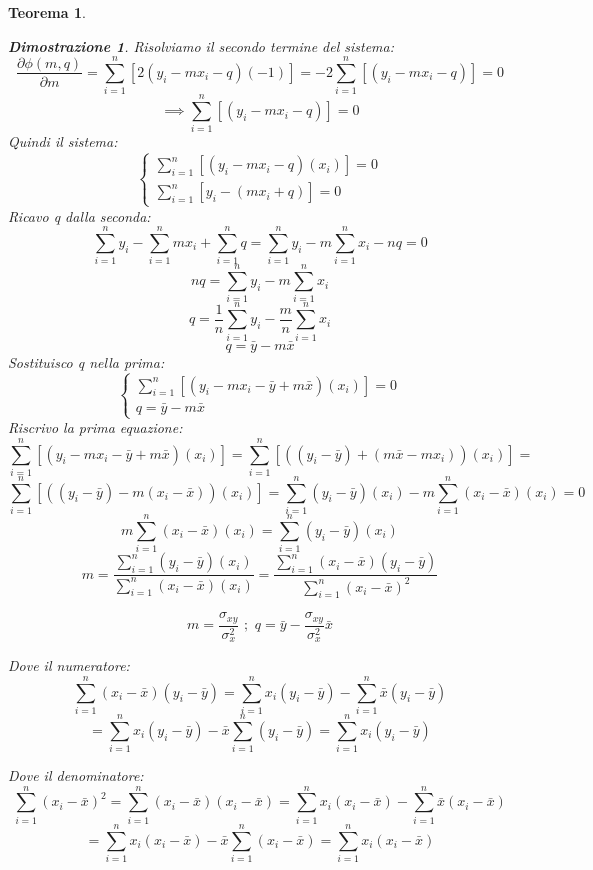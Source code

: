 \documentclass{article}
\newtheorem{teorema}{Teorema}[section]
\newtheorem{dimostrazione}{Dimostrazione}
\begin{document}
\begin{teorema}
\begin{dimostrazione}
              Risolviamo il secondo termine del sistema: 
             $$\frac{\partial\phi(m,q)}{\partial m} = \sum_{i=1}^{n} [2(y_i-mx_i-q)(-1)] =  -2\sum_{i=1}^{n} [(y_i-mx_i-q)]=0 $$ 
             $$\implies\sum_{i=1}^{n} [(y_i-mx_i-q)]=0 
             $$
             Quindi il sistema: 
             $$
              \begin{cases}
               \sum_{i=1}^{n} [(y_i-mx_i-q)(x_i)]=0 \\
               \sum_{i=1}^{n} [y_i-(mx_i+q)]=0 
             \end{cases}
             $$
             Ricavo q dalla seconda: 
             $$\sum_{i=1}^{n}y_i-\sum_{i=1}^{n}mx_i+\sum_{i=1}^{n}q=
             \sum_{i=1}^{n}y_i-m\sum_{i=1}^{n}x_i-nq=0$$
             $$
                nq = \sum_{i=1}^{n}y_i-m\sum_{i=1}^{n}x_i
             $$
             $$ q = \frac{1}{n}\sum_{i=1}^{n}y_i-\frac{m}{n}\sum_{i=1}^{n}x_i$$
             $$ q =\bar{y}-m\bar{x}$$
             Sostituisco q nella prima: 
             $$
             \begin{cases}
               \sum_{i=1}^{n} [(y_i-mx_i-\bar{y}+m\bar{x})(x_i)]=0 \\
               q =\bar{y}-m\bar{x}
             \end{cases}
             $$
             Riscrivo la prima equazione: 
             $$\sum_{i=1}^{n} [(y_i-mx_i-\bar{y}+m\bar{x})(x_i)]=
               \sum_{i=1}^{n} [((y_i-\bar{y})+(m\bar{x}-mx_i))(x_i)]=$$
               $$\sum_{i=1}^{n} [((y_i-\bar{y})-m(x_i-\bar{x}))(x_i)]= 
                 \sum_{i=1}^{n} (y_i-\bar{y})(x_i) -m\sum_{i=1}^{n}(x_i-\bar{x})(x_i) =0
               $$
               $$m \sum_{i=1}^{n}(x_i-\bar{x})(x_i)= \sum_{i=1}^{n} (y_i-\bar{y})(x_i)$$
               $$m =    \frac{\sum_{i=1}^{n} (y_i-\bar{y})(x_i)}{\sum_{i=1}^{n}(x_i-\bar{x})(x_i)} =  \frac{\sum_{i=1}^{n} (x_i-\bar{x})(y_i-\bar{y})}
                    {\sum_{i=1}^{n}(x_i-\bar{x})^2} $$
                    
                $$
                        m= \frac{\sigma_{xy}}{ \sigma^2_x}\,\,;\,\, q = \bar{y} - \frac{\sigma_{xy}}{ \sigma^2_x}\bar{x}
                $$
                    
            Dove il numeratore:
            $$\sum_{i=1}^{n} (x_i-\bar{x})(y_i-\bar{y}) =  \sum_{i=1}^{n}x_i(y_i-\bar{y}) - \sum_{i=1}^{n}\bar{x}(y_i-\bar{y})$$
            $$
                = \sum_{i=1}^{n}x_i(y_i-\bar{y})- \bar{x}\sum_{i=1}^{n}(y_i-\bar{y})
                = \sum_{i=1}^{n}x_i(y_i-\bar{y})
            $$
               
            Dove il denominatore:
               $$ \sum_{i=1}^{n}(x_i-\bar{x})^2  = \sum_{i=1}^{n}(x_i-\bar{x})(x_i-\bar{x})
                = \sum_{i=1}^{n}x_i(x_i-\bar{x})- \sum_{i=1}^{n}\bar{x}(x_i-\bar{x})
               $$
               $$
                   = \sum_{i=1}^{n}x_i(x_i-\bar{x})-\bar{x}\sum_{i=1}^{n}(x_i-\bar{x})= 
                    \sum_{i=1}^{n}x_i(x_i-\bar{x})
               $$
               
         \end{dimostrazione}
        \end{teorema}
        \newpage
        
\end{document}
